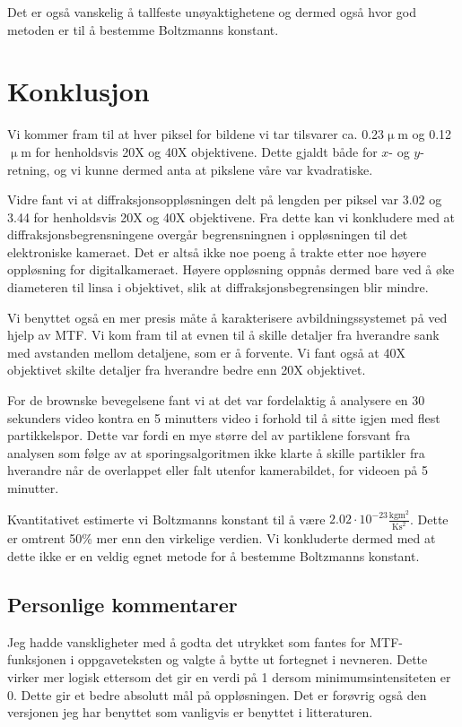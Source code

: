 \documentclass[a4paper,11pt, twocolumn]{article}
\begin{document}
Det er også vanskelig å tallfeste unøyaktighetene og dermed også hvor god metoden er til å bestemme Boltzmanns konstant.
\section{Konklusjon}
Vi kommer fram til at hver piksel for bildene vi tar tilsvarer ca. 0.23$\upmu$m og 0.12$\upmu$m for henholdsvis 20X og 40X objektivene. Dette gjaldt både for $x$- og $y$-retning, og vi kunne dermed anta at pikslene våre var kvadratiske. 

Vidre fant vi at diffraksjonsoppløsningen delt på lengden per piksel var 3.02 og 3.44 for henholdsvis 20X og 40X objektivene. Fra dette kan vi konkludere med at diffraksjonsbegrensningene overgår begrensningnen i oppløsningen til det elektroniske kameraet. Det er altså ikke noe poeng å trakte etter noe høyere oppløsning for digitalkameraet. Høyere oppløsning oppnås dermed bare ved å øke diameteren til linsa i objektivet, slik at diffraksjonsbegrensingen blir mindre.

Vi benyttet også en mer presis måte å karakterisere avbildningssystemet på ved hjelp av MTF. Vi kom fram til at evnen til å skille detaljer fra hverandre sank med avstanden mellom detaljene, som er å forvente. Vi fant også at 40X objektivet skilte detaljer fra hverandre bedre enn 20X objektivet. 

For de brownske bevegelsene fant vi at det var fordelaktig å analysere en 30 sekunders video kontra en 5 minutters video i forhold til å sitte igjen med flest partikkelspor. Dette var fordi en mye større del av partiklene forsvant fra analysen som følge av at sporingsalgoritmen ikke klarte å skille partikler fra hverandre når de overlappet eller falt utenfor kamerabildet, for videoen på 5 minutter.

Kvantitativet estimerte vi Boltzmanns konstant til å være $2.02\cdot10^{-23}\frac{\text{kgm}^2}{\text{Ks}^2}$. Dette er omtrent 50\% mer enn den virkelige verdien. Vi konkluderte dermed med at dette ikke er en veldig egnet metode for å bestemme Boltzmanns konstant.


\subsection{Personlige kommentarer} 
Jeg hadde vanskligheter med å godta det utrykket som fantes for MTF-funksjonen i oppgaveteksten og valgte å bytte ut fortegnet i nevneren. Dette virker mer logisk ettersom det gir en verdi på 1 dersom minimumsintensiteten er 0. Dette gir et bedre absolutt mål på oppløsningen. Det er forøvrig også den versjonen jeg har benyttet som vanligvis er benyttet i litteraturen. 
\end{document}
